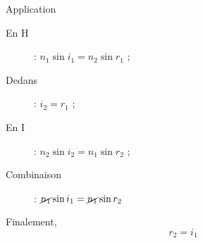 \documentclass[../main/main.tex]{subfiles}
\begin{document}
\begin{tcbraster}[raster columns=11, raster equal height=rows]
\begin{tcolorbox}[blankest, raster multicolumn=6, space to=\myspace]
\begin{tcbraster}[raster columns=1]
\begin{NCexem}[sidebyside, righthand width=1.5cm,
                add to natural height=\myspace]{Application}
                \begin{description}
                    \item[En H] : $n_1\sin i_1 = n_2\sin r_1$ ;
                    \item[Dedans] : $i_2 = r_1$ ;
                    \item[En I] : $n_2\sin i_2 = n_1\sin r_2$ ;
                    \item[Combinaison] :
                        $\cancel{n_1}\sin i_1 = \cancel{n_1}\sin r_2$
                \end{description}
                \tcblower
                Finalement,
                \[\boxed{r_2 = i_1}\]
            \end{NCexem}
        \end{tcbraster}
    \end{tcolorbox}
    
\end{tcbraster}

\newpage

\setcounter{section}{8}
\end{document}

